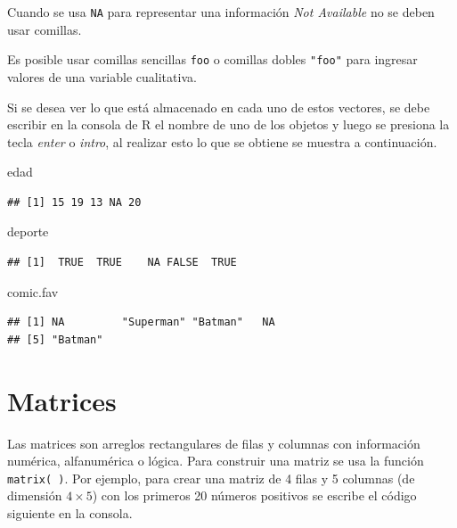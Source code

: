 \documentclass[10pt,]{krantz}
\makeatletter
\newenvironment{Shaded}{\begin{snugshade}}{\end{snugshade}}
\newcommand{\NormalTok}[1]{{#1}}
\let\proglang=\textsf
\newenvironment{kframe}{%
\medskip{}
\setlength{\fboxsep}{.8em}
 \def\at@end@of@kframe{}%
 \ifinner\ifhmode%
  \def\at@end@of@kframe{\end{minipage}}%
  \begin{minipage}{\columnwidth}%
 \fi\fi%
 \def\FrameCommand##1{\hskip\@totalleftmargin \hskip-\fboxsep
 \colorbox{shadecolor}{##1}\hskip-\fboxsep
     \hskip-\linewidth \hskip-\@totalleftmargin \hskip\columnwidth}%
 \MakeFramed {\advance\hsize-\width
   \@totalleftmargin\z@ \linewidth\hsize
   \@setminipage}}%
 {\par\unskip\endMakeFramed%
 \at@end@of@kframe}
\renewenvironment{Shaded}{\begin{kframe}}{\end{kframe}}
\let\BeginKnitrBlock\begin \let\EndKnitrBlock\end
\makeatother
\begin{document}
\BeginKnitrBlock{rmdwarning}
Cuando se usa \texttt{NA} para representar una información
\textit{Not Available} no se deben usar comillas.
\EndKnitrBlock{rmdwarning}

\BeginKnitrBlock{rmdnote}
Es posible usar comillas sencillas
\texttt{\textquotesingle{}foo\textquotesingle{}} o comillas dobles
\texttt{"foo"} para ingresar valores de una variable cualitativa.
\EndKnitrBlock{rmdnote}

Si se desea ver lo que está almacenado en cada uno de estos vectores, se
debe escribir en la consola de \proglang{R} el nombre de uno de los
objetos y luego se presiona la tecla \textit{enter} o \textit{intro}, al
realizar esto lo que se obtiene se muestra a continuación.

\begin{Shaded}
\begin{Highlighting}[]
\NormalTok{edad}
\end{Highlighting}
\end{Shaded}

\begin{verbatim}
## [1] 15 19 13 NA 20
\end{verbatim}

\begin{Shaded}
\begin{Highlighting}[]
\NormalTok{deporte}
\end{Highlighting}
\end{Shaded}

\begin{verbatim}
## [1]  TRUE  TRUE    NA FALSE  TRUE
\end{verbatim}

\begin{Shaded}
\begin{Highlighting}[]
\NormalTok{comic.fav}
\end{Highlighting}
\end{Shaded}

\begin{verbatim}
## [1] NA         "Superman" "Batman"   NA        
## [5] "Batman"
\end{verbatim}

\section{Matrices}\label{matrices}

Las matrices  son arreglos rectangulares de filas y
columnas con información numérica, alfanumérica o lógica. Para construir
una matriz se usa la función \texttt{matrix(\ )}. Por ejemplo, para
crear una matriz de 4 filas y 5 columnas (de dimensión \(4 \times 5\))
con los primeros 20 números positivos se escribe el código siguiente en
la consola.
\end{document}

